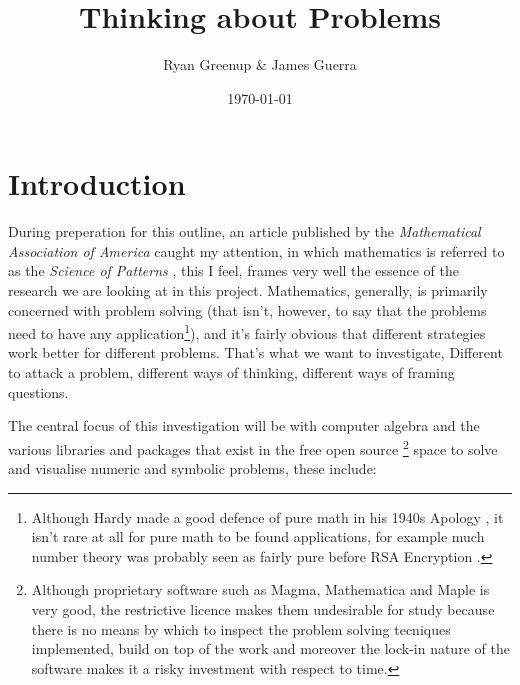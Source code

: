 \documentclass[11pt]{article}
\author{Ryan Greenup \& James Guerra}
\date{\today}
\title{Thinking about Problems}
\begin{document}
\maketitle
\tableofcontents


\section{Introduction}
\label{sec:orgef6fd2a}

During preperation for this outline, an article published by the \emph{Mathematical
Association of America} caught my attention, in which mathematics is referred to
as the \emph{Science of Patterns} \cite{friedMathematicsSciencePatterns2010}, this I
feel, frames very well the essence of the research we are looking at in this
project. Mathematics, generally, is primarily concerned with problem solving
(that isn't, however, to say that the problems need to have any
application\footnote{Although Hardy made a good defence of pure math in his 1940s Apology \cite{hardyMathematicianApology2012}, it isn't rare at all for pure math to be found applications, for example much number theory was probably seen as fairly pure before RSA Encryption \cite{spraulHowSoftwareWorks2015}.}), and it's fairly obvious that different strategies work
better for different problems. That's what we want to investigate, Different to
attack a problem, different ways of thinking, different ways of framing
questions.

The central focus of this investigation will be with computer algebra and the
various libraries and packages that exist in the free open source \footnote{Although proprietary software such as Magma, Mathematica and Maple is very good, the restrictive licence makes them undesirable for study because there is no means by which to inspect the problem solving tecniques implemented, build on top of the work and moreover the lock-in nature of the software makes it a risky investment with respect to time.} space to solve
and visualise numeric and symbolic problems, these include:
\end{document}
